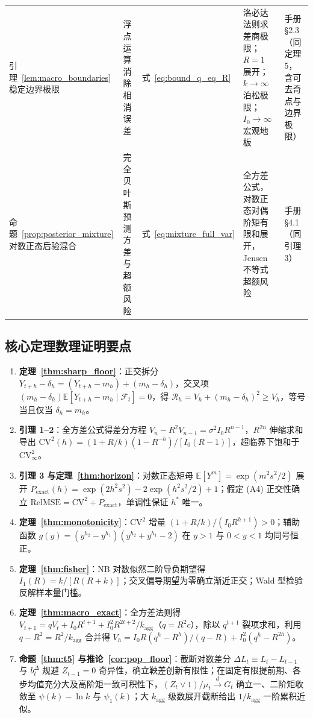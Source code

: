 \documentclass[11pt,a4paper]{article}
\theoremstyle{plain}
\theoremstyle{definition}
\begin{document}
\begin{table}[htbp]
\begin{tabular}{@{}>{\raggedright\arraybackslash}p{2.3cm}>{\raggedright\arraybackslash}p{2.6cm}>{\raggedright\arraybackslash}p{1.6cm}>{\raggedright\arraybackslash}p{4.6cm}>{\raggedright\arraybackslash}p{3.4cm}@{}}
\addlinespace[3pt]
引理~\ref{lem:macro_boundaries} 稳定边界极限 & 浮点运算消除相消误差 & 式~\eqref{eq:bound_q_eq_R} & 洛必达法则求差商极限；$R=1$ 展开；$k\to\infty$ 泊松极限；$I_0\to\infty$ 宏观地板 & 手册 §2.3（同定理 5，含可去奇点与边界极限） \\
\addlinespace[3pt]
命题~\ref{prop:posterior_mixture} 对数正态后验混合 & 完全贝叶斯预测方差与超额风险 & 式~\eqref{eq:mixture_full_var} & 全方差公式，对数正态对偶阶矩有限和展开，Jensen 不等式超额风险 & 手册 §4.1（同引理 3） \\
\bottomrule
\end{tabular}%
\end{table}




\clearpage
{\fontsize{8.5pt}{10.8pt}\selectfont
\subsection*{核心定理数理证明要点}

\begin{enumerate}[itemsep=0.2pt,topsep=0.5pt,parsep=0pt]
\item \textbf{定理~\ref{thm:sharp_floor}}：正交拆分 $Y_{t+h}-\delta_h = (Y_{t+h}-m_h)+(m_h-\delta_h)$，交叉项 $(m_h-\delta_h)\mathbb{E}[Y_{t+h}-m_h\mid\mathcal{F}_t]=0$，得 $\mathcal{R}_h = V_h+(m_h-\delta_h)^2\ge V_h$，等号当且仅当 $\delta_h=m_h$。
\item \textbf{引理 1--2}：全方差公式得差分方程 $V_n-R^2V_{n-1}=\sigma^2I_0R^{n-1}$，$R^{2n}$ 伸缩求和导出 $\text{CV}^2(h)=(1+R/k)(1-R^{-h})/[I_0(R-1)]$，超临界下饱和于 $\text{CV}^2_\infty$。
\item \textbf{引理 3 与定理~\ref{thm:horizon}}：对数正态矩母 $\mathbb{E}[Y^m]=\exp(m^2s^2/2)$ 展开 $P_{\text{exact}}(h)=\exp(2h^2s^2)-2\exp(h^2s^2/2)+1$；假定 (A4) 正交性确立 $\text{RelMSE}=\text{CV}^2+P_{\text{exact}}$，单调性保证 $h^*$ 唯一。
\item \textbf{定理~\ref{thm:monotonicity}}：$\text{CV}^2$ 增量 $(1+R/k)/(I_0R^{h+1})>0$；辅助函数 $g(y)=(y^{h_2}-y^{h_1})(y^{h_2}+y^{h_1}-2)$ 在 $y>1$ 与 $0<y<1$ 均同号恒正。
\item \textbf{定理~\ref{thm:fisher}}：NB 对数似然二阶导负期望得 $I_1(R)=k/[R(R+k)]$；交叉偏导期望为零确立渐近正交；Wald 型检验反解样本量门槛。
\item \textbf{定理~\ref{thm:macro_exact}}：全方差法则得 $V_{t+1}=qV_t+I_0R^{t+1}+I_0^2R^{2t+2}/k_{\text{agg}}$（$q=R^2c$），除以 $q^{t+1}$ 裂项求和，利用 $q-R^2=R^2/k_{\text{agg}}$ 合并得 $V_h=I_0R(q^h-R^h)/(q-R)+I_0^2(q^h-R^{2h})$。
\item \textbf{命题~\ref{thm:t5} 与推论~\ref{cor:pop_floor}}：截断对数差分 $\Delta L_t \equiv L_t - L_{t-1}$ 与 $b_t^\Delta$ 规避 $Z_{t-1}=0$ 奇异性，确立鞅差创新有限性；在固定有限提前期、各步均值充分大及高阶矩一致可积性下，$(Z_t\vee 1)/\mu_t \xrightarrow{d} G_t$ 确立一、二阶矩收敛至 $\psi(k)-\ln k$ 与 $\psi_1(k)$；大 $k_{\text{agg}}$ 级数展开截断给出 $1/k_{\text{agg}}$ 一阶累积近似。
\end{enumerate}

}
\end{document}

